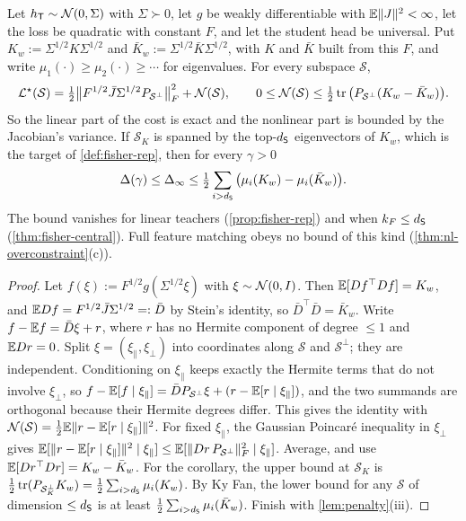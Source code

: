 \begin{theorem}\label{thm:poincare}
\Mo\Ck Let $h_{\mathsf{T}}\sim\mathcal{N}(0,\Sigma)$ with $\Sigma\succ0$, let $g$ be weakly differentiable with $\mathbb{E}\|J\|^2<\infty$, let the loss be quadratic
with constant $F$, and let the student head be universal. Put $K_w:=\Sigma^{1/2}K\Sigma^{1/2}$ and $\bar K_w:=\Sigma^{1/2}\bar K\Sigma^{1/2}$, with
$K$ and $\bar K$ built from this $F$, and write $\mu_1(\cdot)\ge\mu_2(\cdot)\ge\cdots$ for eigenvalues. For every subspace $\mathcal S$,
\[
\mathcal{L}^\star(\mathcal S)=\tfrac12\big\|F^{1/2}\bar J\Sigma^{1/2}P_{\mathcal S^\perp}\big\|_F^2+\mathcal N(\mathcal S),\qquad
0\le\mathcal N(\mathcal S)\le\tfrac12\operatorname{tr}\big(P_{\mathcal S^\perp}(K_w-\bar K_w)\big).
\]
So the linear part of the cost is exact and the nonlinear part is bounded by the Jacobian's variance. If $\mathcal S_K$ is
spanned by the top-$d_{\mathsf{S}}$ eigenvectors of $K_w$, which is the target of \cref{def:fisher-rep}, then for every $\gamma>0$
\[
\Delta(\gamma)\le\Delta_\infty\le\tfrac12\sum_{i>d_{\mathsf{S}}}\big(\mu_i(K_w)-\mu_i(\bar K_w)\big).
\]
The bound vanishes for linear teachers (\cref{prop:fisher-rep}) and when $k_F\le d_{\mathsf{S}}$ (\cref{thm:fisher-central}). Full feature
matching obeys no bound of this kind (\cref{thm:nl-overconstraint}(c)).
\end{theorem}
\begin{proof}
Let $f(\xi):=F^{1/2}g(\Sigma^{1/2}\xi)$ with $\xi\sim\mathcal{N}(0,I)$. Then $\mathbb{E}[Df^\top Df]=K_w$, and $\mathbb{E} Df=F^{1/2}\bar J\Sigma^{1/2}=:\bar D$
by Stein's identity, so $\bar D^\top\bar D=\bar K_w$. Write $f-\mathbb{E} f=\bar D\xi+r$, where $r$ has no Hermite component of degree
$\le1$ and $\mathbb{E} Dr=0$. Split $\xi=(\xi_\parallel,\xi_\perp)$ into coordinates along $\mathcal S$ and $\mathcal S^\perp$; they are independent.
Conditioning on $\xi_\parallel$ keeps exactly the Hermite terms that do not involve $\xi_\perp$, so
$f-\mathbb{E}[f\mid\xi_\parallel]=\bar DP_{\mathcal S^\perp}\xi+(r-\mathbb{E}[r\mid\xi_\parallel])$, and the two summands are orthogonal because their
Hermite degrees differ. This gives the identity with $\mathcal N(\mathcal S)=\frac12\mathbb{E}\|r-\mathbb{E}[r\mid\xi_\parallel]\|^2$. For fixed
$\xi_\parallel$, the Gaussian Poincaré inequality in $\xi_\perp$ gives
$\mathbb{E}[\|r-\mathbb{E}[r\mid\xi_\parallel]\|^2\mid\xi_\parallel]\le\mathbb{E}[\|Dr\,P_{\mathcal S^\perp}\|_F^2\mid\xi_\parallel]$. Average, and use
$\mathbb{E}[Dr^\top Dr]=K_w-\bar K_w$. For the corollary, the upper bound at $\mathcal S_K$ is $\frac12\operatorname{tr}(P_{\mathcal S_K^\perp}K_w)=\frac12\sum_{i>d_{\mathsf{S}}}\mu_i(K_w)$.
By Ky Fan, the lower bound for any $\mathcal S$ of dimension $\le d_{\mathsf{S}}$ is at least $\frac12\sum_{i>d_{\mathsf{S}}}\mu_i(\bar K_w)$. Finish with
\cref{lem:penalty}(iii).
\end{proof}
